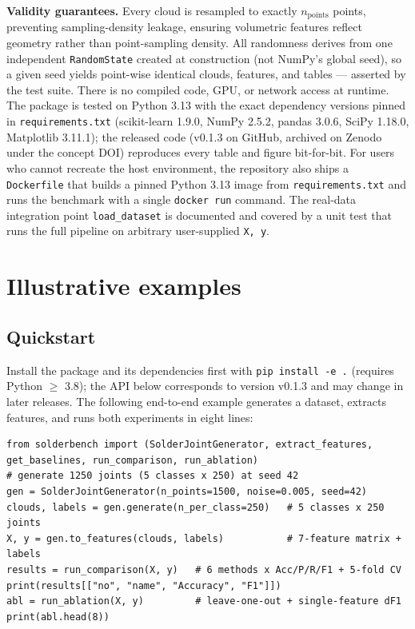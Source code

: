 \documentclass[3p]{elsarticle}
\begin{document}
\textbf{Validity guarantees. }Every cloud is resampled to exactly $n_{\mathrm{points}}$ points, preventing sampling-density leakage, ensuring volumetric features reflect geometry rather than point-sampling density. All randomness derives from one independent \texttt{RandomState} created at construction (not NumPy's global seed), so a given seed yields point-wise identical clouds, features, and tables --- asserted by the test suite. There is no compiled code, GPU, or network access at runtime. The package is tested on Python 3.13 with the exact dependency versions pinned in \texttt{requirements.txt} (scikit-learn 1.9.0, NumPy 2.5.2, pandas 3.0.6, SciPy 1.18.0, Matplotlib 3.11.1); the released code (v0.1.3 on GitHub, archived on Zenodo under the concept DOI) reproduces every table and figure bit-for-bit. For users who cannot recreate the host environment, the repository also ships a \texttt{Dockerfile} that builds a pinned Python 3.13 image from \texttt{requirements.txt} and runs the benchmark with a single \texttt{docker run} command. The real-data integration point \texttt{load\_dataset} is documented and covered by a unit test that runs the full pipeline on arbitrary user-supplied \texttt{X, y}.
\section{Illustrative examples}
\subsection{Quickstart}
Install the package and its dependencies first with \texttt{pip install -e .} (requires Python $\ge$ 3.8); the API below corresponds to version v0.1.3 and may change in later releases. The following end-to-end example generates a dataset, extracts features, and runs both experiments in eight lines:
{\footnotesize
\begin{verbatim}
from solderbench import (SolderJointGenerator, extract_features,
get_baselines, run_comparison, run_ablation)
# generate 1250 joints (5 classes x 250) at seed 42
gen = SolderJointGenerator(n_points=1500, noise=0.005, seed=42)
clouds, labels = gen.generate(n_per_class=250)   # 5 classes x 250 joints
X, y = gen.to_features(clouds, labels)           # 7-feature matrix + labels
results = run_comparison(X, y)   # 6 methods x Acc/P/R/F1 + 5-fold CV
print(results[["no", "name", "Accuracy", "F1"]])
abl = run_ablation(X, y)         # leave-one-out + single-feature dF1
print(abl.head(8))
\end{verbatim}
}
\end{document}
